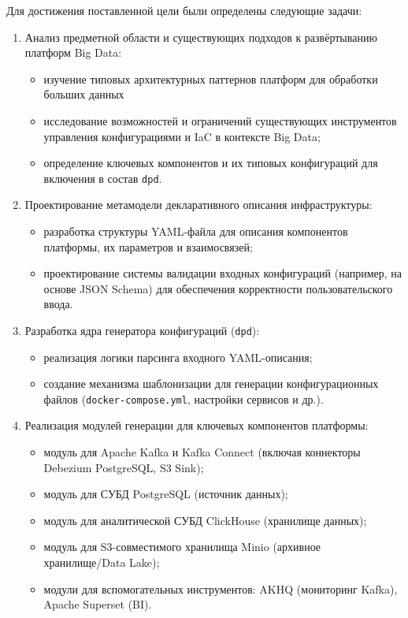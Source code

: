 Для достижения поставленной цели были определены следующие задачи:

\begin{enumerate}
    \item Анализ предметной области и существующих подходов к развёртыванию платформ Big Data:
          \begin{itemize}
              \item изучение типовых архитектурных паттернов платформ для обработки больших данных
              \item исследование возможностей и ограничений существующих инструментов управления конфигурациями и IaC в контексте Big Data;
              \item определение ключевых компонентов и их типовых конфигураций для включения в состав \texttt{dpd}.
          \end{itemize}

    \item Проектирование метамодели декларативного описания инфраструктуры:
          \begin{itemize}
              \item разработка структуры YAML-файла для описания компонентов платформы, их параметров и взаимосвязей;
              \item проектирование системы валидации входных конфигураций (например, на основе JSON Schema) для обеспечения корректности пользовательского ввода.
          \end{itemize}

    \item Разработка ядра генератора конфигураций (\texttt{dpd}):
          \begin{itemize}
              \item реализация логики парсинга входного YAML-описания;
              \item создание механизма шаблонизации для генерации конфигурационных файлов (\texttt{docker-compose.yml}, настройки сервисов и др.).
          \end{itemize}

    \item Реализация модулей генерации для ключевых компонентов платформы:
          \begin{itemize}
              \item модуль для Apache Kafka и Kafka Connect (включая коннекторы Debezium PostgreSQL, S3 Sink);
              \item модуль для СУБД PostgreSQL (источник данных);
              \item модуль для аналитической СУБД ClickHouse (хранилище данных);
              \item модуль для S3-совместимого хранилища Minio (архивное хранилище/Data Lake);
              \item модули для вспомогательных инструментов: AKHQ (мониторинг Kafka), Apache Superset (BI).
          \end{itemize}


\end{enumerate}
